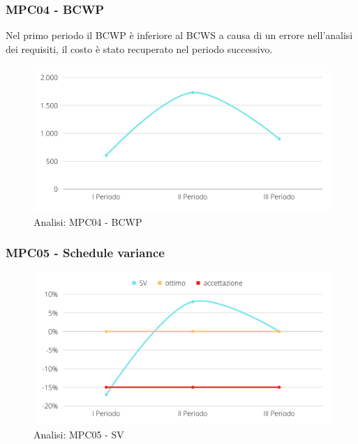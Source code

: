 \subsubsection{MPC04 - BCWP}
Nel primo periodo il BCWP è inferiore al BCWS a causa di un errore nell'analisi dei requisiti, il costo è stato recuperato nel periodo successivo.
\begin{figure}[H]
    \centering
    \includegraphics[scale=0.50]{Sezioni/images/analisi-BCWP.png}
    \caption{Analisi: MPC04 - BCWP}
\end{figure}

\subsubsection{MPC05 - Schedule variance}
\begin{figure}[H]
    \centering
    \includegraphics[scale=0.50]{Sezioni/images/analisi-SV.png}
    \caption{Analisi: MPC05 - SV}
\end{figure}

